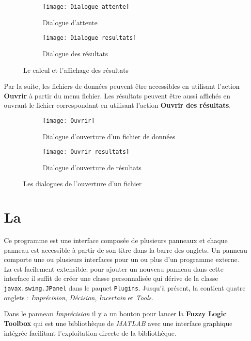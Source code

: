 \begin{figure}[H]
\begin{subfigure}{0.39\textwidth}
\texttt{[image: Dialogue\_attente]}
\caption{Dialogue d'attente}
\end{subfigure}
\hfill
\begin{subfigure}{0.59\textwidth}
\texttt{[image: Dialogue\_resultats]}
\caption{Dialogue des résultats}
\end{subfigure}
\caption{Le calcul et l'affichage des résultats}
\end{figure}

Par la suite, les fichiers de données peuvent être accessibles en utilisant l'action \textbf{Ouvrir} à partir
du menu fichier. Les résultats peuvent être aussi affichés en ouvrant le fichier correspondant en utilisant l'action
\textbf{Ouvrir des résultats}.

\begin{figure}[H]
\begin{subfigure}{0.49\textwidth}
\texttt{[image: Ouvrir]}
\caption{Dialogue d'ouverture d'un fichier de données}
\end{subfigure}
\hfill
\begin{subfigure}{0.49\textwidth}
\texttt{[image: Ouvrir\_resultats]}
\caption{Dialogue d'ouverture de résultats}
\end{subfigure}
\caption{Les dialogues de l'ouverture d'un fichier}
\end{figure}

\section{La \platformename}

Ce programme est une interface composée de plusieurs panneaux et chaque panneau est accessible
à partir de son titre dans la barre des onglets. Un panneau comporte une ou plusieurs interfaces pour
un ou plus d'un programme externe.  La \platformename est facilement extensible; pour ajouter un nouveau
panneau dans cette interface il suffit de créer une classe personnalisée qui dérive de la classe
\mbox{\texttt{javax.swing.JPanel}} dans le paquet \texttt{Plugins}. Jusqu'à présent, la \platformename
contient quatre onglets : \textit{Imprécision}, \textit{Décision}, \textit{Incertain}
et \textit{Tools}.

Dans le panneau \textit{Imprécision} il y a un bouton pour lancer la \textbf{Fuzzy Logic Toolbox} qui est une
bibliothèque de \textit{MATLAB} avec une interface graphique intégrée facilitant l'exploitation directe
de la bibliothèque.

